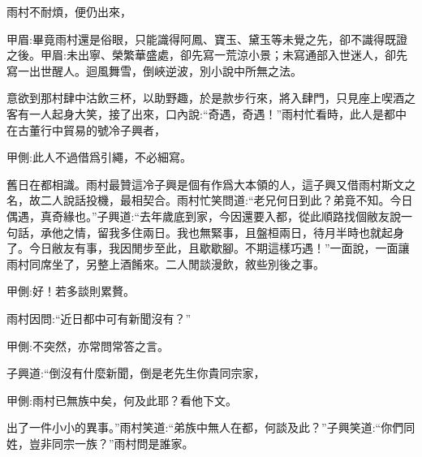\begin{parag}
    雨村不耐煩，便仍出來，\begin{note}甲眉:畢竟雨村還是俗眼，只能識得阿鳳、寶玉、黛玉等未覺之先，卻不識得既證之後。甲眉:未出寧、榮繁華盛處，卻先寫一荒涼小景；未寫通部入世迷人，卻先寫一出世醒人。迴風舞雪，倒峽逆波，別小說中所無之法。\end{note}意欲到那村肆中沽飲三杯，以助野趣，於是款步行來，將入肆門，只見座上喫酒之客有一人起身大笑，接了出來，口內說:“奇遇，奇遇！”雨村忙看時，此人是都中在古董行中貿易的號冷子興者，\begin{note}甲側:此人不過借爲引繩，不必細寫。\end{note}舊日在都相識。雨村最贊這冷子興是個有作爲大本領的人，這子興又借雨村斯文之名，故二人說話投機，最相契合。雨村忙笑問道:“老兄何日到此？弟竟不知。今日偶遇，真奇緣也。”子興道:“去年歲底到家，今因還要入都，從此順路找個敝友說一句話，承他之情，留我多住兩日。我也無緊事，且盤桓兩日，待月半時也就起身了。今日敝友有事，我因閒步至此，且歇歇腳。不期這樣巧遇！”一面說，一面讓雨村同席坐了，另整上酒餚來。二人閒談漫飲，敘些別後之事。\begin{note}甲側:好！若多談則累贅。\end{note}
\end{parag}


\begin{parag}
    雨村因問:“近日都中可有新聞沒有？”\begin{note}甲側:不突然，亦常問常答之言。\end{note}子興道:“倒沒有什麼新聞，倒是老先生你貴同宗家，\begin{note}甲側:雨村已無族中矣，何及此耶？看他下文。\end{note}出了一件小小的異事。”雨村笑道:“弟族中無人在都，何談及此？”子興笑道:“你們同姓，豈非同宗一族？”雨村問是誰家。
\end{parag}


